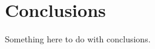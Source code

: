 
\section{Conclusions}
\label{chpConclusions-secConclusions}

Something here to do with conclusions.

